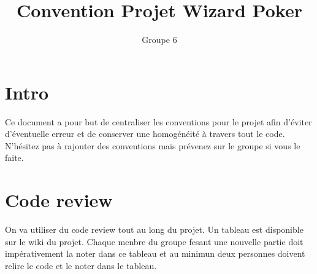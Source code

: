 \documentclass{article}
\title{Convention Projet Wizard Poker}
\author{Groupe 6}
\date{}
\begin{document}
\maketitle
\section{Intro}
Ce document a pour but de centraliser les conventions pour le projet afin d'éviter d'éventuelle erreur et de conserver une homogénéité à travers tout le code. N'hésitez pas à rajouter des conventions mais prévenez sur le groupe si vous le faite.
\section{Code review}
On va utiliser du code review tout au long du projet. Un tableau est disponible sur le wiki du projet. Chaque menbre du groupe fesant une nouvelle partie doit impérativement la noter dans ce tableau et au minimun deux personnes doivent relire le code et le noter dans le tableau.
\end{document}
